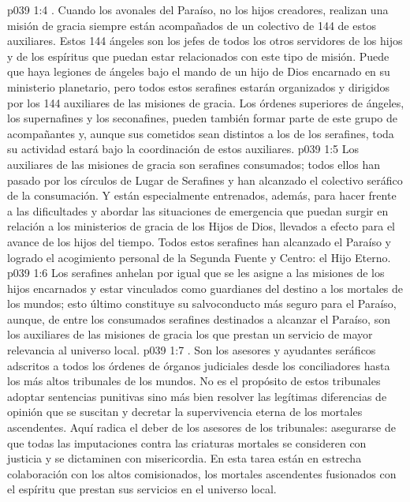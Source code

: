 \vs p039 1:4 \pc {}. Cuando los avonales del Paraíso, no los hijos creadores, realizan una misión de gracia siempre están acompañados de un colectivo de 144 de estos auxiliares. Estos 144 ángeles son los jefes de todos los otros servidores de los hijos y de los espíritus que puedan estar relacionados con este tipo de misión. Puede que haya legiones de ángeles bajo el mando de un hijo de Dios encarnado en su ministerio planetario, pero todos estos serafines estarán organizados y dirigidos por los 144 auxiliares de las misiones de gracia. Los órdenes superiores de ángeles, los supernafines y los seconafines, pueden también formar parte de este grupo de acompañantes y, aunque sus cometidos sean distintos a los de los serafines, toda su actividad estará bajo la coordinación de estos auxiliares.
\vs p039 1:5 Los auxiliares de las misiones de gracia son serafines consumados; todos ellos han pasado por los círculos de Lugar de Serafines y han alcanzado el colectivo seráfico de la consumación. Y están especialmente entrenados, además, para hacer frente a las dificultades y abordar las situaciones de emergencia que puedan surgir en relación a los ministerios de gracia de los Hijos de Dios, llevados a efecto para el avance de los hijos del tiempo. Todos estos serafines han alcanzado el Paraíso y logrado el acogimiento personal de la Segunda Fuente y Centro: el Hijo Eterno.
\vs p039 1:6 Los serafines anhelan por igual que se les asigne a las misiones de los hijos encarnados y estar vinculados como guardianes del destino a los mortales de los mundos; esto último constituye su salvoconducto más seguro para el Paraíso, aunque, de entre los consumados serafines destinados a alcanzar el Paraíso, son los auxiliares de las misiones de gracia los que prestan un servicio de mayor relevancia al universo local.
\vs p039 1:7 . Son los asesores y ayudantes seráficos adscritos a todos los órdenes de órganos judiciales desde los conciliadores hasta los más altos tribunales de los mundos. No es el propósito de estos tribunales adoptar sentencias punitivas sino más bien resolver las legítimas diferencias de opinión que se suscitan y decretar la supervivencia eterna de los mortales ascendentes. Aquí radica el deber de los asesores de los tribunales: asegurarse de que todas las imputaciones contra las criaturas mortales se consideren con justicia y se dictaminen con misericordia. En esta tarea están en estrecha colaboración con los altos comisionados, los mortales ascendentes fusionados con el espíritu que prestan sus servicios en el universo local.
